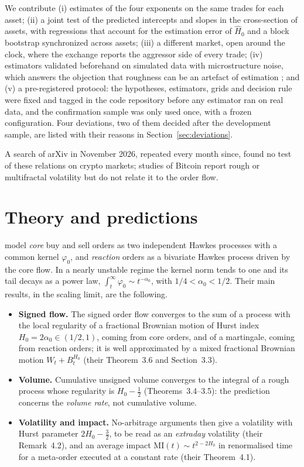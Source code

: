 \documentclass[11pt]{article}
\newcommand{\Hz}{H_0}
\begin{document}
We contribute (i) estimates of the four exponents on the same trades for each asset;
(ii) a joint test of the predicted intercepts and slopes in the cross-section of assets,
with regressions that account for the estimation error of $\hat\Hz$ and a block bootstrap
synchronized across assets; (iii) a different market, open around the clock, where the
exchange reports the aggressor side of every trade; (iv) estimators validated beforehand on
simulated data with microstructure noise, which answers the objection that roughness can
be an artefact of estimation \citep{contdas2024}; and (v) a pre-registered protocol: the
hypotheses, estimators, grids and decision rule were fixed and tagged in the code
repository before any estimator ran on real data, and the confirmation sample was only
used once, with a frozen configuration. Four deviations, two of them decided after the
development sample, are listed with their reasons in Section~\ref{sec:deviations}.

A search of arXiv in November 2026, repeated every month since, found no test of these
relations on crypto markets; studies of Bitcoin report rough or
multifractal volatility \citep{takaishi2020} but do not relate it to the order flow.

\section{Theory and predictions}
\label{sec:theory}
\citet{mocrs2026} model \emph{core} buy and sell orders as two independent Hawkes
processes with a common kernel $\varphi_0$, and \emph{reaction} orders as a bivariate
Hawkes process driven by the core flow. In a nearly unstable regime the kernel norm tends to
one and its tail decays as a power law, $\int_t^\infty \varphi_0 \sim t^{-\alpha_0}$, with
$1/4<\alpha_0<1/2$. Their main results, in the scaling limit, are the following.

\begin{itemize}
\item \textbf{Signed flow.} The signed order flow converges to the sum of a process with
the local regularity of a fractional Brownian motion of Hurst index $\Hz=2\alpha_0\in
(1/2,1)$, coming from core orders, and of a martingale, coming from reaction orders; it is
well approximated by a mixed fractional Brownian motion $W_t + B^{\Hz}_t$ (their
Theorem~3.6 and Section~3.3).
\item \textbf{Volume.} Cumulative unsigned volume converges to the integral of a rough
process whose regularity is $\Hz-\tfrac12$ (Theorems~3.4--3.5): the prediction concerns
the \emph{volume rate}, not cumulative volume.
\item \textbf{Volatility and impact.} No-arbitrage arguments then give a volatility with
Hurst parameter $2\Hz-\tfrac32$, to be read as an \emph{extraday} volatility (their
Remark~4.2), and an average impact $\mathrm{MI}(t)\sim t^{2-2\Hz}$ in renormalised time
for a meta-order executed at a constant rate (their Theorem~4.1).
\end{itemize}
\end{document}
